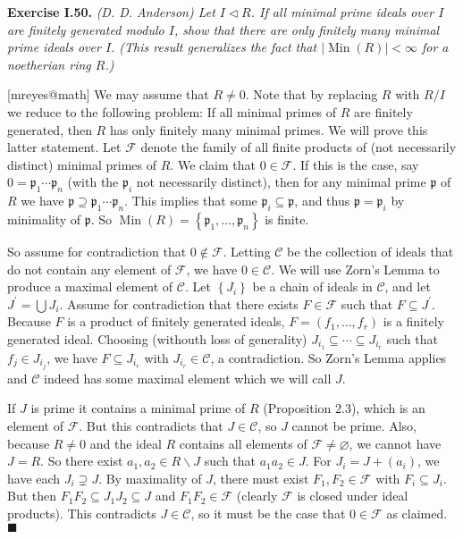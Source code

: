 \documentclass{article}
\makeatletter
\newcommand\<{\triangleleft}
\DeclareMathOperator{\Min}{Min}
\newenvironment{exercise}[1]{\gdef\currentEx{#1}\begin{trivlist}\item[]%
                \textbf{Exercise #1.} \it}{\end{trivlist}}
\newenvironment{solution}[1]{\def\x{#1}\begin{trivlist}\item[]\hspace*{-.5em}[\x]}
                {\hspace*{\fill} $\blacksquare$
                \protected@write0{}{\currentEx, \x}
                \end{trivlist}}
\makeatother
\begin{document}
 \begin{exercise}{I.50}
  (D. D. Anderson) Let $I\vartriangleleft R$. If all minimal prime ideals over
  $I$ are finitely generated modulo $I$, show that there are only finitely many
  minimal prime ideals over $I$. (This result generalizes the fact that
  $\left\vert \Min\left(  R\right)  \right\vert <\infty$ for a
  noetherian ring $R$.)
 \end{exercise}
 \begin{solution}{mreyes@math}
  We may assume that $R\neq0$. Note that by replacing $R$ with $R/I$ we reduce
  to the following problem: If all minimal primes of $R$ are finitely generated,
  then $R$ has only finitely many minimal primes. We will prove this latter
  statement. Let $\mathcal{F}$ denote the family of all finite products of (not
  necessarily distinct) minimal primes of $R$. We claim that $0\in\mathcal{F}$.
  If this is the case, say $0=\mathfrak{p}_{1}\cdots\mathfrak{p}_{n}$ (with the
  $\mathfrak{p}_{i}$ not necessarily distinct), then for any minimal prime
  $\mathfrak{p}$ of $R$ we have $\mathfrak{p\supseteq p}_{1}\cdots
  \mathfrak{p}_{n}$. This implies that some $\mathfrak{p}_{i}\subseteq
  \mathfrak{p}$, and thus $\mathfrak{p=p}_{i}$ by minimality of $\mathfrak{p}$.
  So $\Min\left(  R\right)  =\left\{  \mathfrak{p}_{1}%
  ,\ldots,\mathfrak{p}_{n}\right\}  $ is finite.

  So assume for contradiction that $0\notin\mathcal{F}$. Letting $\mathcal{C}$
  be the collection of ideals that do not contain any element of $\mathcal{F}$,
  we have $0\in\mathcal{C}$. We will use Zorn's Lemma to produce a maximal
  element of $\mathcal{C}$. Let $\left\{  J_{i}\right\}  $ be a chain of ideals
  in $\mathcal{C}$, and let $J^{\prime}=%
  {\textstyle\bigcup}
  J_{i}$. Assume for contradiction that there exists $F\in\mathcal{F}$ such that
  $F\subseteq J^{\prime}$. Because $F$ is a product of finitely generated
  ideals, $F=\left(  f_{1},\ldots,f_{r}\right)  $ is a finitely generated ideal.
  Choosing (withouth loss of generality) $J_{i_{1}}\subseteq\cdots\subseteq
  J_{i_{r}}$ such that $f_{j}\in J_{i_{j}}$, we have $F\subseteq J_{i_{r}}$ with
  $J_{i_{r}}\in\mathcal{C}$, a contradiction. So Zorn's Lemma applies and
  $\mathcal{C}$ indeed has some maximal element which we will call $J$.

  If $J$ is prime it contains a minimal prime of $R$ (Proposition 2.3), which is
  an element of $\mathcal{F}$. But this contradicts that $J\in\mathcal{C}$, so
  $J$ cannot be prime. Also, because $R\neq0$ and the ideal $R$ contains all
  elements of $\mathcal{F\neq\varnothing}$, we cannot have $J=R$. So there exist
  $a_{1},a_{2}\in R\smallsetminus J$ such that $a_{1}a_{2}\in J$. For
  $J_{i}=J+\left(  a_{i}\right)  $, we have each $J_{i}\supsetneq J$. By
  maximality of $J$, there must exist $F_{1},F_{2}\in\mathcal{F}$ with
  $F_{i}\subseteq J_{i}$. But then $F_{1}F_{2}\subseteq J_{1}J_{2}\subseteq J$
  and $F_{1}F_{2}\in\mathcal{F}$ (clearly $\mathcal{F}$ is closed under ideal
  products). This contradicts $J\in\mathcal{C}$, so it must be the case that
  $0\in\mathcal{F}$ as claimed.
 \end{solution}
\end{document}

